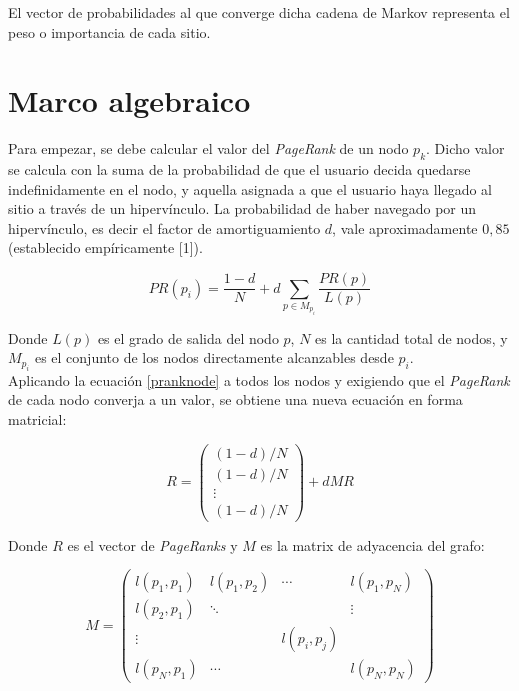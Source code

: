 \documentclass[%
    final,
    notitlepage,
    narroweqnarray,
    inline,
    twoside,
    invited
    ]{lib/ieee}
\begin{document}
El vector de probabilidades al que converge dicha cadena de Markov representa el peso o importancia de cada sitio.

\section{Marco algebraico}

\par Para empezar, se debe calcular el valor del \textit{PageRank} de un nodo $p_{k}$. Dicho valor se calcula con la suma de la probabilidad de que el usuario
decida quedarse indefinidamente en el nodo, y aquella asignada a que el usuario haya llegado al sitio a través de un hipervínculo. La probabilidad
de haber navegado por un hipervínculo, es decir el factor de amortiguamiento $d$, vale aproximadamente $0,85$ (establecido empíricamente [1]).

\begin{equation}\label{pranknode}
PR(p_i) = \frac{1-d}{N} + d \sum_{p \in M_{p_{i}}} \frac{PR(p)}{L(p)}
\end{equation}

Donde $L(p)$ es el grado de salida del nodo $p$, $N$ es la cantidad total de nodos, y $M_{p_i}$ es el conjunto de los nodos directamente alcanzables
desde $p_i$.\\

Aplicando la ecuación \eqref{pranknode} a todos los nodos y exigiendo que el \textit{PageRank} de cada nodo converja a un valor,
se obtiene una nueva ecuación en forma matricial:

\begin{equation}\label{pranksolution}
R = \begin{pmatrix}
(1-d)/N \\ (1-d)/N \\ \vdots \\ (1-d)/N
\end{pmatrix} + dMR
\end{equation}

Donde $R$ es el vector de \textit{PageRanks} y $M$ es la matrix de adyacencia del grafo:

\begin{equation}\label{M}
M=\begin{pmatrix}
l(p_{1},p_{1}) & l(p_{1},p_{2}) & \cdots & l(p_{1},p_{N}) \\
l(p_{2},p_{1}) & \ddots & & \vdots \\
\vdots & & l(p_{i}, p_{j}) & \\
l(p_{N},p_{1}) & \cdots &  & l(p_{N},p_{N})
\end{pmatrix}
\end{equation}
\end{document}
